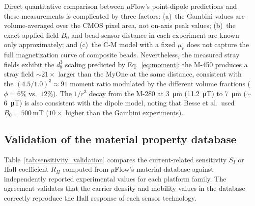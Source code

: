 \documentclass[preprint,review,12pt]{elsarticle}
\begin{document}
Direct quantitative comparison between $\mu$Flow's point-dipole predictions and these measurements is complicated by three factors: (a)~the Gambini values are volume-averaged over the CMOS pixel area, not on-axis peak values; (b)~the exact applied field $B_0$ and bead-sensor distance in each experiment are known only approximately; and (c)~the C-M model with a fixed $\mu_r$ does not capture the full magnetization curve of composite beads. Nevertheless, the measured stray fields exhibit the $d_b^3$ scaling predicted by Eq.~\eqref{eq:moment}: the M-450 produces a stray field ${\sim}21\times$ larger than the MyOne at the same distance, consistent with the $(4.5/1.0)^3 \approx 91$ moment ratio modulated by the different volume fractions ($\phi = 6\%$ vs.\ $12\%$). The $1/r^3$ decay from the M-280 at \SI{3}{\micro\meter} (\SI{11.2}{\micro\tesla}) to \SI{7}{\micro\meter} (${\sim}$\SI{6}{\micro\tesla}) is also consistent with the dipole model, noting that Besse et al.\ used $B_0 = \SI{500}{\milli\tesla}$ ($10\times$ higher than the Gambini experiments).

\subsection{Validation of the material property database}
\label{sec:matvalidation}

Table~\ref{tab:sensitivity_validation} compares the current-related sensitivity $S_I$ or Hall coefficient $R_H$ computed from $\mu$Flow's material database against independently reported experimental values for each platform family. The agreement validates that the carrier density and mobility values in the database correctly reproduce the Hall response of each sensor technology.
\end{document}
